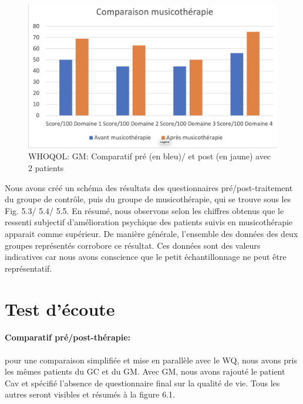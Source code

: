  \begin{figure}[th]
 	\centering
 	\includegraphics[width=1.0\linewidth]{images/Compmusico.png}
 	\caption[Schéma du déroulement]{ WHOQOL: GM: Comparatif pré (en bleu)/ et post (en jaune) avec 2 
 	patients}
 	
 \end{figure}
 
 
 Nous avons créé un schéma des résultats des questionnaires
 pré/post-traitement du groupe de contrôle, puis du groupe de musicothérapie,
 qui  se trouve sous les Fig. 5.3/ 5.4/ 5.5.
 En résumé, nous observons selon les chiffres obtenus que  le ressenti
 subjectif d'amélioration psychique
 des patients suivis en musicothérapie apparait comme
 supérieur.
 De manière générale, l'ensemble des données des deux groupes représentés
 corrobore ce résultat.
 Ces données sont des valeurs indicatives car nous avons conscience que le petit échantillonnage ne
 peut être représentatif.

 
 \clearpage

 \section{Test d'écoute}
  \paragraph{Comparatif pré/post-thérapie:}
 pour une comparaison simplifiée et mise en parallèle avec le WQ, nous avons pris les mêmes   
 patients du GC et du GM. Avec GM, nous avons rajouté  le patient Cav et spécifié l'absence de 
 questionnaire final sur la qualité de vie.
 Tous les autres seront visibles et résumés à la figure 6.1.
